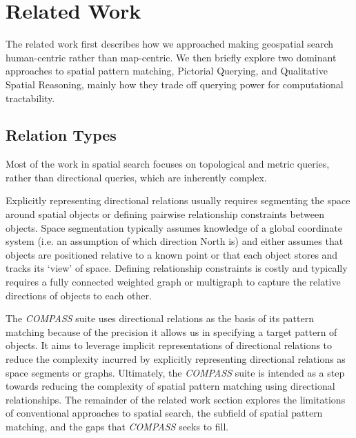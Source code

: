 \section{Related Work}
\label{section:related}


The related work first describes how we approached making geospatial search human-centric rather than map-centric. 
We then briefly explore two dominant approaches to spatial pattern matching, Pictorial Querying, and Qualitative Spatial Reasoning, mainly how they trade off querying power for computational tractability. 

\subsection*{Relation Types}

\par{Most of the work in spatial search focuses on topological and metric queries, rather than directional queries, which are inherently complex.


    Explicitly representing directional relations usually requires segmenting the space around spatial objects or defining pairwise relationship constraints between objects. 
    Space segmentation typically assumes knowledge of a global coordinate system (i.e. an assumption of which direction North is) and either assumes that objects are positioned relative to a known point or that each object stores and tracks its `view' of space.  
    Defining relationship constraints is costly and typically requires a fully connected weighted graph or multigraph to capture the relative directions of objects to each other.
}


\par{
    The \emph{COMPASS} suite uses directional relations as the basis of its pattern matching because of the precision it allows us in specifying a target pattern of objects.
    It aims to leverage implicit representations of directional relations to reduce the complexity incurred by explicitly representing directional relations as space segments or graphs. 
    Ultimately, the \emph{COMPASS} suite is intended as a step towards reducing the complexity of spatial pattern matching using directional relationships.
    The remainder of the related work section explores the limitations of conventional approaches to spatial search, the subfield of spatial pattern matching, and the gaps that \emph{COMPASS} seeks to fill.
}



